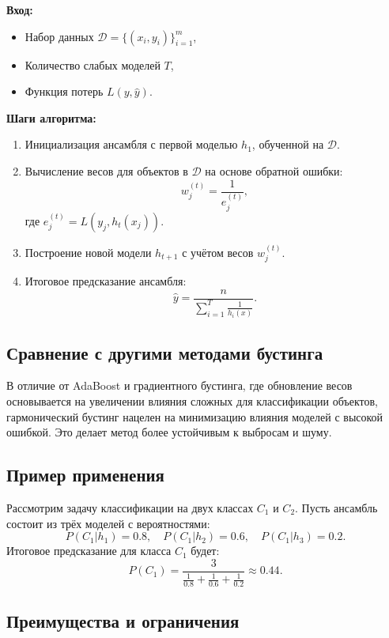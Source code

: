 \textbf{Вход:}
\begin{itemize}
    \item Набор данных \( \mathcal{D} = \{(x_i, y_i)\}_{i=1}^m \),
    \item Количество слабых моделей \( T \),
    \item Функция потерь \( L(y, \hat{y}) \).
\end{itemize}

\textbf{Шаги алгоритма:}
\begin{enumerate}
    \item Инициализация ансамбля с первой моделью \( h_1 \), обученной на \( \mathcal{D} \).
    \item Вычисление весов для объектов в \( \mathcal{D} \) на основе обратной ошибки:
          \[
              w_j^{(t)} = \frac{1}{e_j^{(t)}},
          \]
          где \( e_j^{(t)} = L(y_j, h_t(x_j)) \).
    \item Построение новой модели \( h_{t+1} \) с учётом весов \( w_j^{(t)} \).
    \item Итоговое предсказание ансамбля:
          \[
              \hat{y} = \frac{n}{\sum_{i=1}^T \frac{1}{h_i(x)}}.
          \]
\end{enumerate}

\subsection*{Сравнение с другими методами бустинга}

В отличие от AdaBoost и градиентного бустинга, где обновление весов основывается на увеличении влияния сложных для классификации объектов, гармонический бустинг нацелен на минимизацию влияния моделей с высокой ошибкой. Это делает метод более устойчивым к выбросам и шуму.

\subsection*{Пример применения}

Рассмотрим задачу классификации на двух классах \( C_1 \) и \( C_2 \). Пусть ансамбль состоит из трёх моделей с вероятностями:
\[
    P(C_1 | h_1) = 0.8, \quad P(C_1 | h_2) = 0.6, \quad P(C_1 | h_3) = 0.2.
\]
Итоговое предсказание для класса \( C_1 \) будет:
\[
    P(C_1) = \frac{3}{\frac{1}{0.8} + \frac{1}{0.6} + \frac{1}{0.2}} \approx 0.44.
\]

\subsection*{Преимущества и ограничения}

